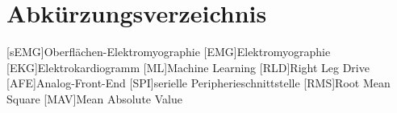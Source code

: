 \section*{Abkürzungsverzeichnis}
\begin{acronym}
    [sEMG]{Oberflächen-Elektromyographie}
    [EMG]{Elektromyographie}
    [EKG]{Elektro\-kardiogramm}
    [ML]{Machine Learning}
    [RLD]{Right Leg Drive}
    [AFE]{Analog-Front-End}
    [SPI]{serielle Peripherieschnittstelle}
    [RMS]{Root Mean Square}
    [MAV]{Mean Absolute Value}
\end{acronym}
